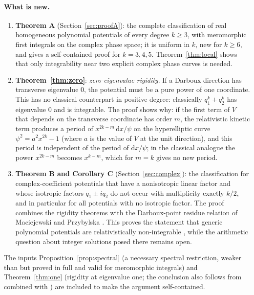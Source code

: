 \documentclass[11pt]{article}
\numberwithin{equation}{section}
\theoremstyle{definition}
\theoremstyle{remark}
\newcommand{\dd}{\mathrm d}
\begin{document}
\paragraph{What is new.}
\begin{enumerate}[leftmargin=*]
\item \textbf{Theorem A} (Section~\ref{sec:proofA}): the complete classification of real homogeneous polynomial
potentials of every degree $k\ge3$, with meromorphic first integrals on the complex phase space; it is uniform in $k$,
new for $k\ge6$, and gives a self-contained proof for $k=3,4,5$. Theorem~\ref{thm:local} shows that only
integrability near two explicit complex phase curves is needed.
\item \textbf{Theorem~\ref{thm:zero}}: \emph{zero-eigenvalue rigidity}. If a Darboux direction has transverse
eigenvalue $0$, the potential must be a pure power of one coordinate. This has no classical counterpart in positive degree: classically $q_1^k+q_2^k$ has eigenvalue $0$ and is integrable. The proof shows why: if the first term of $V$ that depends on the transverse coordinate has order $m$, the relativistic kinetic term produces a period of $x^{2k-m}\,\dd x/\psi$ on the hyperelliptic curve $\psi^2=a^2x^{2k}-1$ (where $a$ is the value of $V$ at the unit direction), and this period is independent of the period of $\dd x/\psi$; in the classical analogue the power $x^{2k-m}$ becomes $x^{k-m}$, which for $m=k$ gives no new period.
\item \textbf{Theorem B and Corollary C} (Section~\ref{sec:complex}): the classification for complex-coefficient potentials that have a nonisotropic linear factor and whose isotropic factors $q_1\pm iq_2$ do not occur with multiplicity exactly $k/2$, and in particular for all potentials with no isotropic factor. The proof combines the rigidity theorems with the Darboux-point residue relation of Maciejewski and Przybylska \cite[Theorem~2.3]{MP05}. This proves the statement that generic polynomial potentials are
relativistically non-integrable \cite[Sec.~VI]{PSM23}, while the arithmetic question about integer solutions posed
there remains open.
\end{enumerate}
The inputs Proposition~\ref{prop:spectral} (a necessary spectral restriction, weaker than
\cite[Theorem~3]{PSM23} but proved in full and valid for meromorphic integrals) and Theorem~\ref{thm:one}
(rigidity at eigenvalue one; the conclusion also follows from \cite[Proposition~1]{PSM23} combined with
\cite[Theorem~1]{Combot13}) are included to make the argument self-contained.
\end{document}
